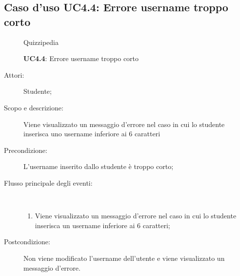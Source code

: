\subsection{Caso d'uso UC4.4: Errore username troppo corto}
	\begin{figure}[H]
		\centering
		\begin{resizedtikzpicture}{\textwidth}
		\begin{umlsystem}[x=0, fill=lightgray!20]{Quizzipedia}
		\end{umlsystem}
		\end{resizedtikzpicture}
		\caption{\textbf{UC4.4}: Errore username troppo corto}
		\label{UC4.4}
	\end{figure}
\begin{description}
\item[Attori:] Studente;
\item[Scopo e descrizione:] Viene visualizzato un messaggio d'errore nel caso in cui lo studente inserisca uno username inferiore ai 6 caratteri
      \item[Precondizione:] L'username inserito dallo studente è troppo corto;

        \item[Flusso principale degli eventi:] \ 
 \begin{enumerate}
          \item Viene visualizzato un messaggio d'errore nel caso in cui lo studente inserisca un username inferiore ai 6 caratteri;

      \end{enumerate}
    \item[Postcondizione:] Non viene modificato l'username dell'utente e viene visualizzato un messaggio d'errore.
  \end{description}
\hypertarget{UC4.5}{}
